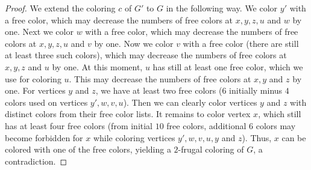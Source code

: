 \documentclass[11pt]{article}
\begin{document}
\begin{proof}
We extend the coloring $c$ of $G'$ to $G$ in the following way. We color $y'$ with a free color, which may decrease the numbers of free colors at $x,y,z,u$ and $w$ by one. Next we color $w$ with a free color, which may decrease the numbers of free colors at $x,y,z,u$ and $v$ by one. Now we color $v$ with a free color (there are still at least three such colors), which may decrease the numbers of free colors at $x,y,z$ and $u$ by one. At this moment, $u$ has still at least one free color, which we use for coloring $u$. This may decrease the numbers of free colors at $x, y$ and $z$ by one. For vertices $y$ and $z$, we have at least two free colors ($6$ initially minus $4$ colors used on vertices $y',w,v,u$). Then we can clearly color vertices $y$ and $z$ with distinct colors from their free color lists. It remains to color vertex $x$, which still has at least four free colors (from initial $10$ free colors, additional $6$ colors may become forbidden for $x$ while coloring vertices $y',w,v,u,y$ and $z$). Thus, $x$ can be colored with one of the free   colors, yielding a $2$-frugal coloring of $G$, a contradiction.
\end{proof}
\end{document}
